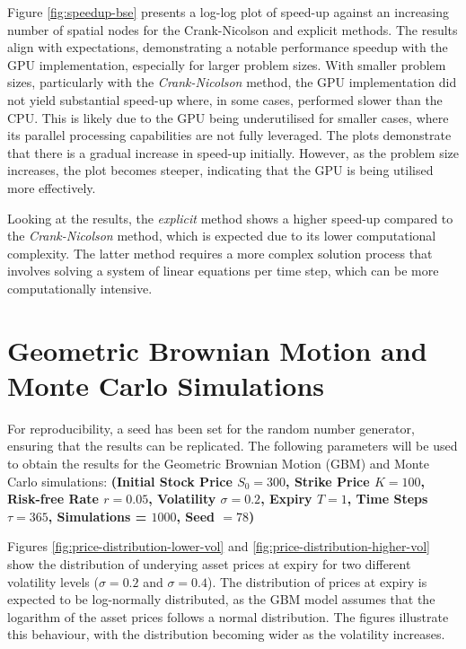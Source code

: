 Figure \ref{fig:speedup-bse} presents a log-log plot of speed-up against an increasing number of spatial nodes for the {Crank-Nicolson} and {explicit} methods. The results align with expectations, demonstrating a notable performance speedup with the GPU implementation, especially for larger problem sizes. With smaller problem sizes, particularly with the \textit{Crank-Nicolson} method, the GPU implementation did not yield substantial speed-up where, in some cases, performed slower than the CPU. This is likely due to the GPU being underutilised for smaller cases, where its parallel processing capabilities are not fully leveraged. The plots demonstrate that there is a gradual increase in speed-up initially. However, as the problem size increases, the plot becomes steeper, indicating that the GPU is being utilised more effectively.

Looking at the results, the \textit{explicit} method shows a higher speed-up compared to the \textit{Crank-Nicolson} method, which is expected due to its lower computational complexity. The latter method requires a more complex solution process that involves solving a system of linear equations per time step, which can be more computationally intensive.

\section{Geometric Brownian Motion and Monte Carlo Simulations}\label{sec:gbm_results}

For reproducibility, a seed has been set for the random number generator, ensuring that the results can be replicated. The following parameters will be used to obtain the results for the Geometric Brownian Motion (GBM) and Monte Carlo simulations: 
\textbf{(Initial Stock Price $S_0 = 300$, Strike Price $K = 100$, Risk-free Rate $r = 0.05$, Volatility $\sigma = 0.2$, Expiry $T = 1$, Time Steps $\tau = 365$, Simulations = $1000$, Seed $= 78$)}

Figures \ref{fig:price-distribution-lower-vol} and \ref{fig:price-distribution-higher-vol} show the distribution of underying asset prices at expiry for two different volatility levels ($\sigma = 0.2$ and $\sigma = 0.4$). The distribution of prices at expiry is expected to be log-normally distributed, as the GBM model assumes that the logarithm of the asset prices follows a normal distribution. The figures illustrate this behaviour, with the distribution becoming wider as the volatility increases.

